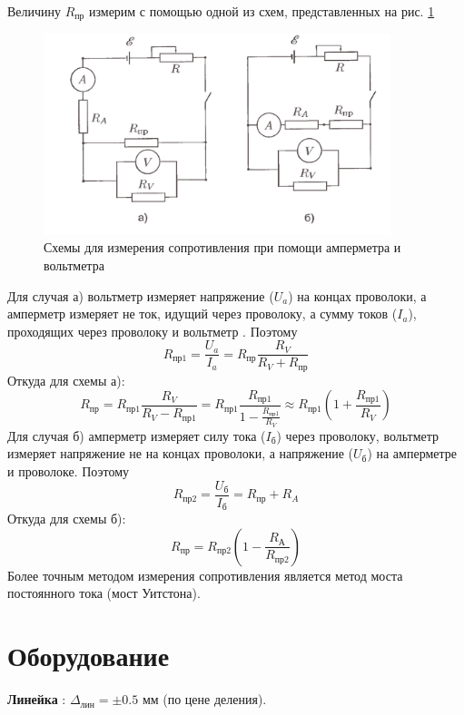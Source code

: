 \documentclass[a4paper,12pt]{article} %
\begin{document}
Величину $R_{\text{пр}}$ измерим с помощью одной из схем, представленных на рис. \ref{схемы}
\begin{figure}[h!]
\begin{center}
\includegraphics[width=0.9\textwidth]{схемы}
\end{center}
\caption{Схемы для измерения сопротивления при помощи амперметра и вольтметра} \label{схемы}
\end{figure}
Для случая а) вольтметр измеряет напряжение ($U_a$) на концах проволоки, а амперметр измеряет не ток, идущий через проволоку, а сумму токов ($I_a$), проходящих через проволоку и вольтметр . Поэтому 
\begin{equation}\label{рпр1}
R_{\text{пр1}}=\frac{U_a}{I_a}=R_{\text{пр}} \frac{R_V}{R_V+R_{\text{пр}}}
\end{equation}
Откуда для схемы а):
\begin{equation}\label{ра}
R_{\text{пр}}=R_{пр1} \frac{R_V}{R_V-R_{\text{пр1}}}=R_{\text{пр1}} \frac{R_{\text{пр1}}}{1-\frac{R_{\text{пр1}}}{R_V}}\approx R_{\text{пр1}} \left( 1+\frac{R_{\text{пр1}}}{R_V}\right)
\end{equation}
Для случая б) амперметр измеряет силу тока ($I_\text{б}$) через проволоку, вольтметр измеряет напряжение не на концах проволоки, а напряжение ($U_\text{б}$) на амперметре и проволоке. Поэтому
\begin{equation}\label{рпр2}
R_{\text{пр2}}=\frac{U_\text{б}}{I_\text{б}}=R_{\text{пр}}+R_A
\end{equation}
Откуда для схемы б):
\begin{equation}\label{рб}
R_{\text{пр}}=R_{\text{пр2}} \left( 1-\frac{R_{\text{А}}}{R_{\text{пр2}}} \right)
\end{equation}
Более точным методом измерения сопротивления является метод моста постоянного тока (мост Уитстона).

\section{Оборудование}
\textbf{Линейка} : $\Delta_{\text{лин}} = \pm 0.5$ мм (по цене деления). 
\end{document}
